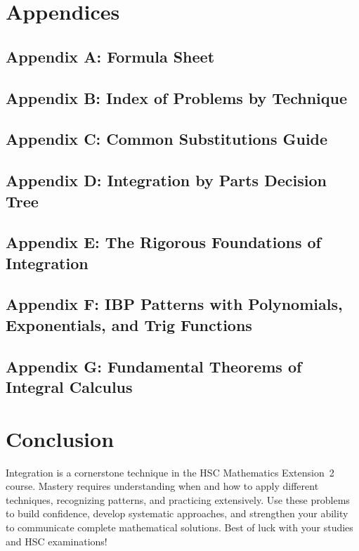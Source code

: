 \documentclass[12pt]{article}
\begin{document}
\newpage
\section{Appendices}

\subsection{Appendix A: Formula Sheet}


\subsection{Appendix B: Index of Problems by Technique}


\subsection{Appendix C: Common Substitutions Guide}


\subsection{Appendix D: Integration by Parts Decision Tree}


\subsection{Appendix E: The Rigorous Foundations of Integration}


\subsection{Appendix F: IBP Patterns with Polynomials, Exponentials, and Trig Functions}


\subsection{Appendix G: Fundamental Theorems of Integral Calculus}


\newpage
\section{Conclusion}
Integration is a cornerstone technique in the HSC Mathematics Extension~2 course. Mastery requires understanding when and how to apply different techniques, recognizing patterns, and practicing extensively. Use these problems to build confidence, develop systematic approaches, and strengthen your ability to communicate complete mathematical solutions. Best of luck with your studies and HSC examinations!
\end{document}
